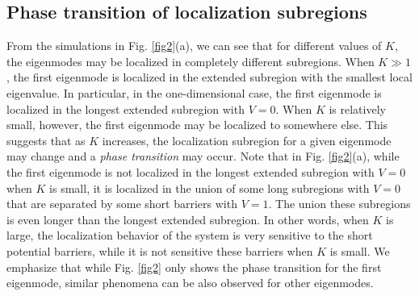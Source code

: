 \documentclass[a4paper,11pt]{article}
\begin{document}
\subsection{Phase transition of localization subregions}
From the simulations in Fig. \ref{fig2}(a), we can see that for different values of $K$, the eigenmodes may be localized in completely different subregions. When $K\gg 1$, the first eigenmode is localized in the extended subregion with the smallest local eigenvalue. In particular, in the one-dimensional case, the first eigenmode is localized in the longest extended subregion with $V = 0$. When $K$ is relatively small, however, the first eigenmode may be localized to somewhere else. This suggests that as $K$ increases, the localization subregion for a given eigenmode may change and a \emph{phase transition} may occur. Note that in Fig. \ref{fig2}(a), while the first eigenmode is not localized in the longest extended subregion with $V = 0$ when $K$ is small, it is localized in the union of some long subregions with $V = 0$ that are separated by some short barriers with $V = 1$. The union these subregions is even longer than the longest extended subregion. In other words, when $K$ is large, the localization behavior of the system is very sensitive to the short potential barriers, while it is not sensitive these barriers when $K$ is small. We emphasize that while Fig. \ref{fig2} only shows the phase transition for the first eigenmode, similar phenomena can be also observed for other eigenmodes.
\end{document}
